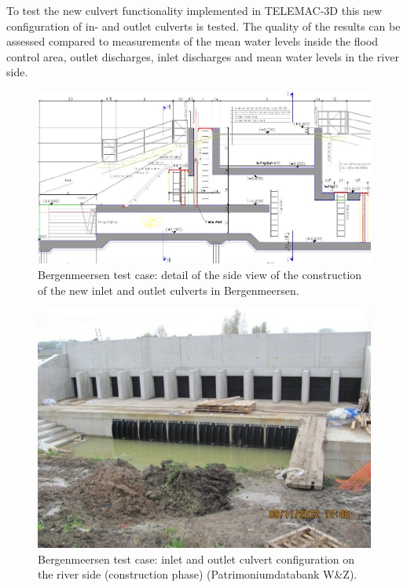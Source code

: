 To test the new culvert functionality implemented in TELEMAC-3D this new configuration of in- and outlet culverts is tested.
The quality of the results can be assessed compared to measurements of the mean water levels inside the flood control area,
outlet discharges, inlet discharges and mean water levels in the river side.

\begin{figure}[H]
\begin{center}
  \includegraphics[scale=0.5]{img/figure1.png}
\end{center}
\caption{Bergenmeersen test case: detail of the side view of
the construction of the new inlet and outlet culverts in Bergenmeersen.}
\label{fig:bergenmeersen_figure1}
\end{figure}

\begin{figure}[H]
\begin{center}
  \includegraphics[scale=1.0]{img/figure2.png}
\end{center}
\caption{Bergenmeersen test case: inlet and outlet culvert configuration on the river side (construction phase) (Patrimoniumdatabank W\&Z).}
\label{fig:bergenmeersen_figure2}
\end{figure}

